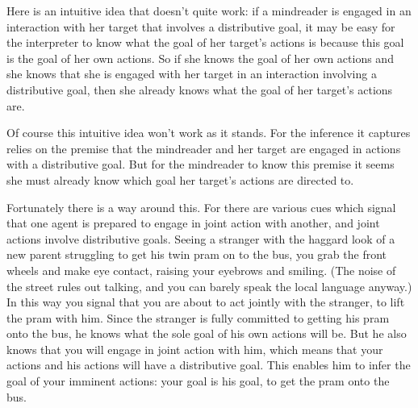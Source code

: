 \documentclass[14pt,a4paper]{extarticle}
\begin{document}
Here is an intuitive idea that doesn't quite work:
if a mindreader is engaged in an interaction with her target that involves a distributive goal, 
it may be easy for the interpreter to know what the goal of her target's actions is because this goal is the goal of her own actions.
So if she knows the goal of her own actions and she knows that she is engaged with her target in an interaction involving a distributive goal,
then she already knows what the goal of her target's actions are.

Of course this intuitive idea won't work as it stands.  
For the inference it captures relies on the premise that the mindreader and her target are engaged in actions with a distributive goal.
But for the mindreader to know this premise it seems she must   already know which goal her target's actions are directed to.

Fortunately there is a way around this.  
For there are various cues which signal that one agent is prepared to engage in joint action with another,
and joint actions involve distributive goals.  
\label{twin_pram}
Seeing a stranger with the haggard look of a new parent struggling to get his twin pram on to the bus, you grab the front wheels and make eye contact, raising your eyebrows and smiling.
(The noise of the street rules out talking, 
and you can barely speak the local language anyway.)   
In this way you signal that you are about to act jointly with the stranger, to lift the pram with him.   
Since the stranger is fully committed to getting his pram onto the bus,
he knows what the sole goal of his own actions will be.
But he also knows that you will engage in joint action with him,
which means that your actions and his actions will have a distributive goal.
This enables him to infer the goal of your imminent actions: 
your goal is his goal, to get the pram onto the bus.
\end{document}
